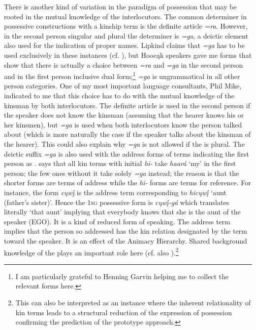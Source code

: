 \documentclass[output=paper]{LSP/langsci}
\begin{document}
 
There is another kind of variation in the paradigm of  possession that may be rooted in the mutual knowledge of the interlocutors. The common determiner in possessive constructions with a kinship term is the definite article \textit{=ra}. However, in the second person singular and plural the determiner is \textit{=ga}, a deictic element also used for the indication of proper names. Lipkind claims that \textit{=ga} has to be used exclusively in these instances (cf. \citealt[31]{Lipkind1945}), but Hoocąk speakers gave me forms that show that there is actually a choice between \textit{=ra} and \textit{=ga} in the second person and in the first person inclusive dual form;\footnote{I am particularly grateful to Henning Garvin helping me to collect the relevant forms here.} \textit{=ga} is ungrammatical in all other person categories. One of my most important language consultants, Phil Mike, indicated to me that this choice has to do with the mutual knowledge of the kinsman by both interlocutors. The definite article is used in the second person if the speaker does not know the kinsman (assuming that the hearer knows his or her kinsmen), but \textit{=ga} is used when both interlocutors know the person talked about (which is more naturally the case if the speaker talks about the kinsman of the hearer). This could also explain why \textit{=ga} is not allowed if the  is plural. The deictic suffix \textit{=ga} is also used with the address forms of  terms indicating the first person as . \citet[31]{Lipkind1945} says that all kin terms with initial \textit{hi-} take \textit{haará} `my' in the first person; the few ones without it take solely \textit{=ga} instead; the reason is that the shorter forms are terms of address while the \textit{hi-} forms are terms for reference. For instance, the form \textit{cųwį́} is the address term corresponding to \textit{hicųwį́} `aunt (father's sister)'. Hence the \textsc{1sg} possessive form is \textit{cųwį́-gá} which translates literally `that aunt' implying that everybody knows that she is the aunt of the speaker (EGO). It is a kind of reduced form of speaking. The address term implies that the person so addressed has the kin relation designated by the term toward the speaker. It is an effect of the Animacy Hierarchy. Shared background knowledge of the  plays an important role here (cf. also \citealt[26f]{Heine1997}).\footnote{This can also be interpreted as an instance where the inherent relationality of kin terms leads to a structural reduction of the expression of possession confirming the prediction of the prototype approach.}
 
\end{document}
